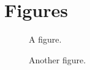 \chapter{Figures}

\vspace*{-3in}

\begin{figure}
\vspace{2.4in}
\caption{A figure.}
\label{arm:fig1}
\end{figure}
\clearpage
\newpage

\begin{figure}
\vspace{2.4in}
\caption{Another figure.}
\label{arm:fig2}
\end{figure}
\clearpage
\newpage
